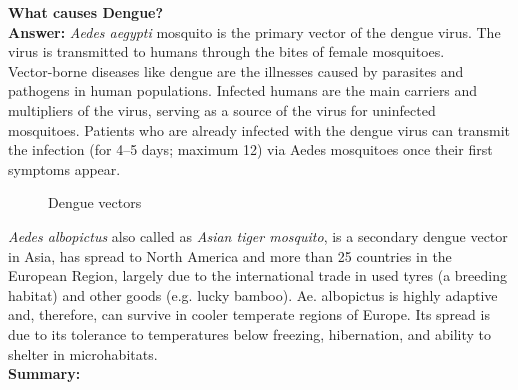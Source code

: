 \documentclass[11pt]{exam}
\begin{document}
\begin{questions}
\newpage
\question
\label{3. Dengue cause }
\textbf{What causes Dengue?}\\
\textbf{Answer:}
\textit{Aedes aegypti} mosquito is the primary vector of the dengue virus. The virus is transmitted to humans through the bites of female mosquitoes. \\
Vector-borne diseases like dengue are the illnesses caused by parasites and pathogens in human populations. Infected humans are the main carriers and multipliers of the virus, serving as a source of the virus for uninfected mosquitoes. Patients who are already infected with the dengue virus can transmit the infection (for 4–5 days; maximum 12) via Aedes mosquitoes once their first symptoms appear. \\ 
\begin{figure}[H]
  \centering
  \hfill
  \caption{Dengue vectors}
  \label{Dengue vectors }
\end{figure} 

\textit{Aedes albopictus} also called as \textit{Asian tiger mosquito}, is a secondary dengue vector in Asia, has spread to North America and more than 25 countries in the European Region, largely due to the international trade in used tyres (a breeding habitat) and other goods (e.g. lucky bamboo). Ae. albopictus is highly adaptive and, therefore, can survive in cooler temperate regions of Europe. Its spread is due to its tolerance to temperatures below freezing, hibernation, and ability to shelter in microhabitats.\\

\textbf{Summary:} \\
\\ \\


\end{questions}
\end{document}
